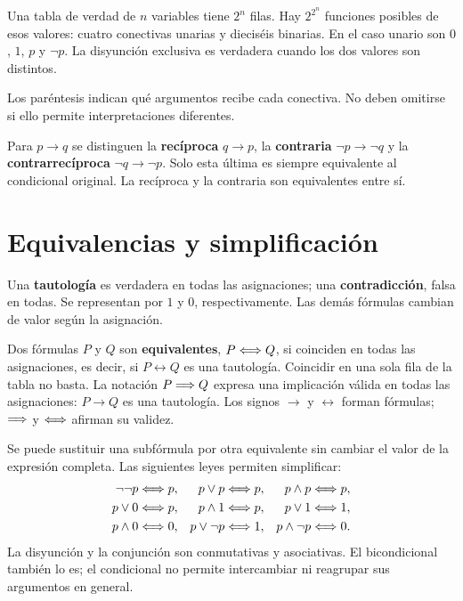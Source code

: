 Una tabla de verdad de $n$ variables tiene $2^n$ filas. Hay
$2^{2^n}$ funciones posibles de esos valores: cuatro conectivas unarias
y dieciséis binarias. En el caso unario son $0$, $1$, $p$ y $\neg p$.
La disyunción exclusiva es verdadera cuando los dos valores son distintos.

Los paréntesis indican qué argumentos recibe cada conectiva.
No deben omitirse si ello permite interpretaciones diferentes.

Para $p\to q$ se distinguen la \textbf{recíproca} $q\to p$,
la \textbf{contraria} $\neg p\to\neg q$ y la
\textbf{contrarrecíproca} $\neg q\to\neg p$.
Solo esta última es siempre equivalente al condicional original.
La recíproca y la contraria son equivalentes entre sí.

\section{Equivalencias y simplificación}
\label{sec:equivalencias}

Una \textbf{tautología} es verdadera en todas las asignaciones;
una \textbf{contradicción}, falsa en todas. Se representan por $1$ y $0$,
respectivamente. Las demás fórmulas cambian de valor según la asignación.

Dos fórmulas $P$ y $Q$ son \textbf{equivalentes}, $P\Longleftrightarrow Q$, si coinciden
en todas las asignaciones, es decir, si $P\leftrightarrow Q$ es una tautología.
Coincidir en una sola fila de la tabla no basta.
La notación $P\Longrightarrow Q$ expresa una implicación válida en todas las
asignaciones: $P\to Q$ es una tautología. Los signos $\to$ y
$\leftrightarrow$ forman fórmulas; $\Longrightarrow$ y $\Longleftrightarrow$ afirman su validez.

Se puede sustituir una subfórmula por otra equivalente sin cambiar el
valor de la expresión completa. Las siguientes leyes permiten simplificar:
\begin{align*}
 \neg\neg p&\Longleftrightarrow p, &
 p\vee p&\Longleftrightarrow p, & p\wedge p&\Longleftrightarrow p,\\
 p\vee0&\Longleftrightarrow p, &
 p\wedge1&\Longleftrightarrow p, & p\vee1&\Longleftrightarrow1,\\
 p\wedge0&\Longleftrightarrow0, &
 p\vee\neg p&\Longleftrightarrow1, & p\wedge\neg p&\Longleftrightarrow0.
\end{align*}
La disyunción y la conjunción son conmutativas y asociativas.
El bicondicional también lo es; el condicional no permite intercambiar
ni reagrupar sus argumentos en general.

